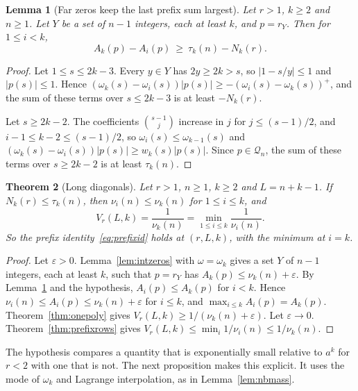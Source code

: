 \documentclass[11pt]{article}
\newtheorem{theorem}{Theorem}[section]
\newtheorem{lemma}[theorem]{Lemma}
\begin{document}
\begin{lemma}[Far zeros keep the last prefix sum largest]\label{lem:farprefix}
Let $r>1$, $k\ge2$ and $n\ge1$.  Let $Y$ be a set of $n-1$ integers, each at
least $k$, and $p=r_Y$.  Then for $1\le i<k$,
\[
  A_k(p)-A_i(p)\ \ge\ \tau_k(n)-N_k(r).
\]
\end{lemma}

\begin{proof}
Let $1\le s\le2k-3$.  Every $y\in Y$ has $2y\ge2k>s$, so $|1-s/y|\le1$ and
$|p(s)|\le1$.  Hence
$(\omega_k(s)-\omega_i(s))|p(s)|\ge-(\omega_i(s)-\omega_k(s))^+$, and the
sum of these terms over $s\le2k-3$ is at least $-N_k(r)$.

Let $s\ge2k-2$.  The coefficients $\binom{s-1}j$ increase in $j$ for
$j\le(s-1)/2$, and $i-1\le k-2\le(s-1)/2$, so $\omega_i(s)\le\omega_{k-1}(s)$
and $(\omega_k(s)-\omega_i(s))|p(s)|\ge w_k(s)|p(s)|$.  Since $p\in\mathcal Q_n$,
the sum of these terms over $s\ge2k-2$ is at least $\tau_k(n)$.
\end{proof}

\begin{theorem}[Long diagonals]\label{thm:longdiag}
Let $r>1$, $n\ge1$, $k\ge2$ and $L=n+k-1$.  If $N_k(r)\le\tau_k(n)$, then
$\nu_i(n)\le\nu_k(n)$ for $1\le i\le k$, and
\[
  V_r(L,k)=\frac1{\nu_k(n)}=\min_{1\le i\le k}\frac1{\nu_i(n)} .
\]
So the prefix identity~\eqref{eq:prefixid} holds at
$(r,L,k)$, with the minimum at $i=k$.
\end{theorem}

\begin{proof}
Let $\varepsilon>0$.  Lemma~\ref{lem:intzeros} with $\omega=\omega_k$ gives a
set $Y$ of $n-1$ integers, each at least $k$, such that $p=r_Y$ has
$A_k(p)\le\nu_k(n)+\varepsilon$.  By Lemma~\ref{lem:farprefix} and the
hypothesis, $A_i(p)\le A_k(p)$ for $i<k$.  Hence
$\nu_i(n)\le A_i(p)\le\nu_k(n)+\varepsilon$ for $i\le k$, and
$\max_{i\le k}A_i(p)=A_k(p)$.  Theorem~\ref{thm:onepoly} gives
$V_r(L,k)\ge1/(\nu_k(n)+\varepsilon)$.  Let $\varepsilon\to0$.
Theorem~\ref{thm:prefixrows} gives
$V_r(L,k)\le\min_i1/\nu_i(n)\le1/\nu_k(n)$.
\end{proof}

The hypothesis compares a quantity that is exponentially small relative to
$a^k$ for $r<2$ with one that is not.  The next proposition makes this explicit.  It uses
the mode of $\omega_k$ and Lagrange interpolation, as in
Lemma~\ref{lem:nbmass}.
\end{document}
